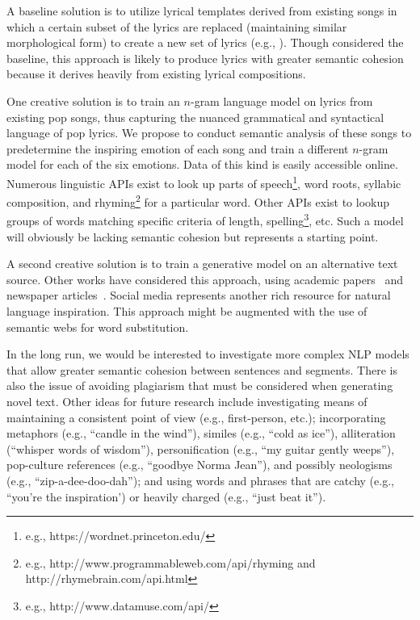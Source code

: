 \documentclass[11pt,phd]{byuprop}
\begin{document}
A baseline solution is to utilize lyrical templates derived from existing songs in which a certain subset of the lyrics are replaced (maintaining similar morphological form) to create a new set of lyrics (e.g., \cite{toivanen2012corpus}). Though considered the baseline, this approach is likely to produce lyrics with greater semantic cohesion because it derives heavily from existing lyrical compositions.

One creative solution is to train an $n$-gram language model on lyrics from existing pop songs, thus capturing the nuanced grammatical and syntactical language of pop lyrics. We propose to conduct semantic analysis of these songs to predetermine the inspiring emotion of each song and train a different $n$-gram model for each of the six emotions. Data of this kind is easily accessible online. Numerous linguistic APIs exist to look up parts of speech\footnote{e.g., https://wordnet.princeton.edu/}, word roots, syllabic composition, and rhyming\footnote{e.g., http://www.programmableweb.com/api/rhyming and http://rhymebrain.com/api.html} for a particular word. Other APIs exist to lookup groups of words matching specific criteria of length, spelling\footnote{e.g., http://www.datamuse.com/api/}, etc. Such a model will obviously be lacking semantic cohesion but represents a starting point.

A second creative solution is to train a generative model on an alternative text source. Other works have considered this approach, using academic papers~\cite{scirea2015smug} and newspaper articles~\cite{toivanen2013automatical}. Social media represents another rich resource for natural language inspiration. This approach might be augmented with the use of semantic webs for word substitution.

In the long run, we would be interested to investigate more complex NLP models that allow greater semantic cohesion between sentences and segments. There is also the issue of avoiding plagiarism that must be considered when generating novel text. Other ideas for future research include investigating means of maintaining a consistent point of view (e.g., first-person, etc.); incorporating metaphors (e.g., ``candle in the wind''), similes (e.g., ``cold as ice''), alliteration (``whisper words of wisdom''), personification (e.g., ``my guitar gently weeps''), pop-culture references (e.g., ``goodbye Norma Jean''), and possibly neologisms (e.g., ``zip-a-dee-doo-dah''); and using words and phrases that are catchy (e.g., ``you're the inspiration') or heavily charged (e.g., ``just beat it'').
\end{document}
